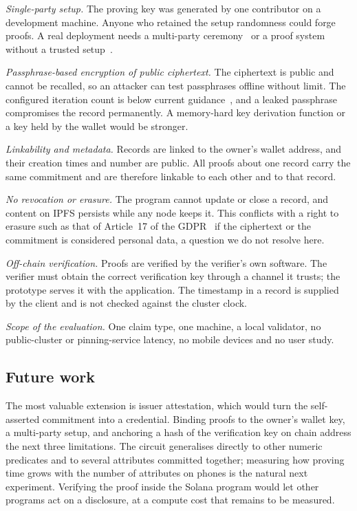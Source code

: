 \emph{Single-party setup.} The proving key was generated by one contributor
on a development machine. Anyone who retained the setup randomness could
forge proofs. A real deployment needs a multi-party
ceremony~\cite{bensasson2015sampling} or a proof system without a trusted
setup~\cite{bunz2018bulletproofs}.

\emph{Passphrase-based encryption of public ciphertext.} The ciphertext is
public and cannot be recalled, so an attacker can test passphrases offline
without limit. The configured iteration count is below current
guidance~\cite{owasp-password}, and a leaked passphrase compromises the
record permanently. A memory-hard key derivation function or a key held by
the wallet would be stronger.

\emph{Linkability and metadata.} Records are linked to the owner's wallet
address, and their creation times and number are public. All proofs about
one record carry the same commitment and are therefore linkable to each
other and to that record.

\emph{No revocation or erasure.} The program cannot update or close a
record, and content on IPFS persists while any node keeps it. This conflicts
with a right to erasure such as that of Article~17 of the
GDPR~\cite{gdpr2016} if the ciphertext or the commitment is considered
personal data, a question we do not resolve here.

\emph{Off-chain verification.} Proofs are verified by the verifier's own
software. The verifier must obtain the correct verification key through a
channel it trusts; the prototype serves it with the application. The
timestamp in a record is supplied by the client and is not checked against
the cluster clock.

\emph{Scope of the evaluation.} One claim type, one machine, a local
validator, no public-cluster or pinning-service latency, no mobile devices
and no user study.

\subsection{Future work}

The most valuable extension is issuer attestation, which would turn the
self-asserted commitment into a credential. Binding proofs to the owner's
wallet key, a multi-party setup, and anchoring a hash of the verification
key on chain address the next three limitations. The circuit generalises
directly to other numeric predicates and to several attributes committed
together; measuring how proving time grows with the number of attributes on
phones is the natural next experiment. Verifying the proof inside the Solana
program would let other programs act on a disclosure, at a compute cost that
remains to be measured.


